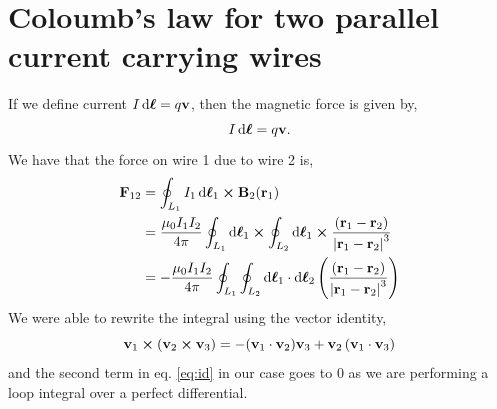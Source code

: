 \documentclass{book}
\begin{document}
\section{Coloumb's law for two parallel current carrying wires}
If we define current $I\dd{\vb*{\ell}} = q\vb{v}$, then the magnetic force is given by,
\begin{equation}
	 I \dd{\vb*{\ell}} = q\vb{v}.
\end{equation}
We have that the force on wire 1 due to wire 2 is,
\begin{equation}
	\begin{split}
		\vb{F}_{12} &= \oint_{L_1} I_1\dd{\vb*{\ell}_1} \cross \vb{B}_2(\vb{r}_1) \\
		& = \frac{\mu_0I_1I_2}{4\pi}\oint_{L_1}\dd{\vb*{\ell}_1}\cross\oint_{L_2}\dd{\vb*{\ell}_1} \cross \frac{\left(\vb{r}_1 - \vb{r}_2\right)}{\left|\vb{r}_1 - \vb{r}_2\right|^3} \\
		& = -\frac{\mu_0I_1I_2}{4\pi}\oint_{L_1}\oint_{L_2} \dd{\vb*{\ell}}_1\cdot\dd{\vb*{\ell}_2} \left(\frac{\left(\vb{r}_1 - \vb{r}_2\right)}{\left|\vb{r}_1 - \vb{r}_2\right|^3}\right)
	\end{split}
\end{equation}
We were able to rewrite the integral using the vector identity,
\begin{equation}
	\vb{v}_1 \cross \left(\vb{v}_2 \cross \vb{v}_3\right) = -(\vb{v}_1 \cdot \vb{v}_2)\vb{v}_3 + \vb{v}_2\left(\vb{v}_1 \cdot \vb{v}_3\right) \label{eq:id}
\end{equation}
and the second term in eq. \eqref{eq:id} in our case goes to 0 as we are performing a loop integral over a perfect differential.
\end{document}
